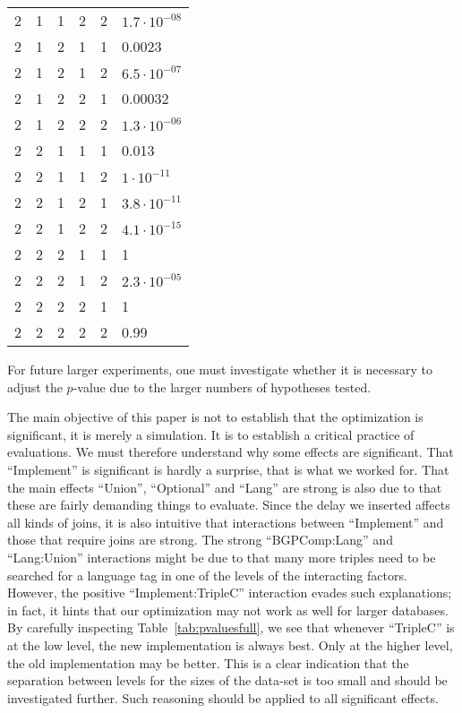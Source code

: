 \documentclass{llncs}
\begin{document}
\begin{table}[ht!]
\begin{center}
\begin{tabular}{cccccl}
  2 & 1 & 1 & 2 & 2 & $1.7 \cdot 10^{-08}$ \\ 
  2 & 1 & 2 & 1 & 1 & 0.0023 \\ 
  2 & 1 & 2 & 1 & 2 & $6.5 \cdot 10^{-07}$ \\ 
  2 & 1 & 2 & 2 & 1 & 0.00032 \\ 
  2 & 1 & 2 & 2 & 2 & $1.3 \cdot 10^{-06}$ \\ 
  2 & 2 & 1 & 1 & 1 & 0.013 \\ 
  2 & 2 & 1 & 1 & 2 & $1 \cdot 10^{-11}$ \\ 
  2 & 2 & 1 & 2 & 1 & $3.8 \cdot 10^{-11}$ \\ 
  2 & 2 & 1 & 2 & 2 & $4.1 \cdot 10^{-15}$ \\ 
  2 & 2 & 2 & 1 & 1 &   1 \\ 
  2 & 2 & 2 & 1 & 2 & $2.3 \cdot 10^{-05}$ \\ 
  2 & 2 & 2 & 2 & 1 &   1 \\ 
  2 & 2 & 2 & 2 & 2 & 0.99 \\ 
   \hline
\end{tabular}
\end{center}
\end{table}


For future larger experiments, one must investigate whether it is
necessary to adjust the $p$-value due to the larger numbers of
hypotheses tested.

The main objective of this paper is not to establish that the
optimization is significant, it is merely a simulation. It is to
establish a critical practice of evaluations. We must therefore
understand why some effects are significant. That
``Implement'' is significant is hardly a surprise, that is what we
worked for. That the main effects ``Union'', ``Optional'' and ``Lang''
are strong is also due to that these are fairly demanding things to
evaluate. Since the delay we inserted affects all kinds of joins, it
is also intuitive that interactions between ``Implement'' and those
that require joins are strong. The strong ``BGPComp:Lang'' and
``Lang:Union'' interactions might be due to that many more triples
need to be searched for a language tag in one of the levels of the
interacting factors. However, the
positive ``Implement:TripleC'' interaction evades such explanations;
in fact, it hints that our optimization may not work as well for
larger databases. By carefully inspecting Table~\ref{tab:pvaluesfull},
we see that whenever ``TripleC'' is at the low level, the
new implementation is always best. Only at the higher level, the old
implementation may be better. This is a clear indication that the
separation between levels for the sizes of the data-set is too small
and should be investigated further. Such reasoning should be applied
to all significant effects.
\end{document}
